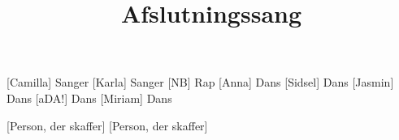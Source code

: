\documentclass[a4paper,11pt]{article}
\title{Afslutningssang\texttrademark}
\begin{document}
\maketitle

\begin{roles}
[Camilla] Sanger
[Karla] Sanger
[NB] Rap
[Anna] Dans
[Sidsel] Dans
[Jasmin] Dans
[aDA!] Dans
[Miriam] Dans
\end{roles}


\begin{props}
	[Person, der skaffer]
	[Person, der skaffer]
\end{props}
\end{document}
